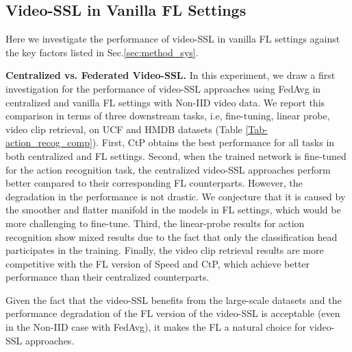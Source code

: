 \subsection{Video-SSL in Vanilla FL Settings}
\label{sec:vanilla}
Here we investigate the performance of video-SSL in vanilla FL settings against the key factors listed in Sec.\ref{sec:method_sys}. 

\noindent \textbf{Centralized vs. Federated Video-SSL.} In this experiment, we draw a first investigation for the performance of video-SSL approaches using FedAvg in centralized and vanilla FL settings with Non-IID video data. We report this comparison in terms of three downstream tasks, i.e, fine-tuning, linear probe, video clip retrieval, on UCF and HMDB datasets (Table \ref{Tab-action_recog_comp}).
First, CtP obtains the best performance for all tasks in both centralized and FL settings.
Second, when the trained network is fine-tuned for the action recognition task, the centralized video-SSL approaches perform better compared to their corresponding FL counterparts. However, the degradation in the performance is not drastic. We conjecture that it is caused by the smoother and flatter manifold in the models in FL settings, which would be more challenging to fine-tune.
Third, the linear-probe results for action recognition show mixed results due to the fact that only the classification head participates in the training.
Finally, the video clip retrieval results are more competitive with the FL version of Speed and CtP, which achieve better performance than their centralized counterparts.

Given the fact that the video-SSL benefits from the large-scale datasets and the performance degradation of the FL version of the video-SSL is acceptable (even in the Non-IID case with FedAvg), it makes the FL a natural choice for video-SSL approaches. 

